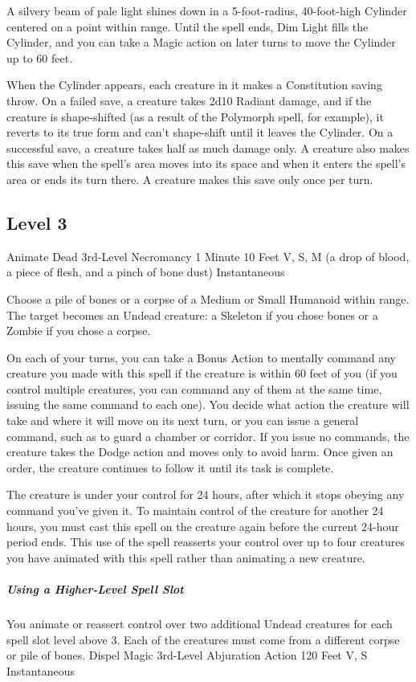 \documentclass[letterpaper,openany,oneside,twocolumn]{book}
\begin{document}
A silvery beam of pale light shines down in a 5-foot-radius, 40-foot-high Cylinder centered on a point within range. Until the spell ends, Dim Light fills the Cylinder, and you can take a Magic action on later turns to move the Cylinder up to 60 feet.

When the Cylinder appears, each creature in it makes a Constitution saving throw. On a failed save, a creature takes 2d10 Radiant damage, and if the creature is shape-shifted (as a result of the Polymorph spell, for example), it reverts to its true form and can't shape-shift until it leaves the Cylinder. On a successful save, a creature takes half as much damage only. A creature also makes this save when the spell's area moves into its space and when it enters the spell's area or ends its turn there. A creature makes this save only once per turn.

\subsection*{Level 3}
\DndSpellHeader
  {Animate Dead}
  {3rd-Level Necromancy}
  {1 Minute}
  {10 Feet}
  {V, S, M (a drop of blood, a piece of flesh, and a pinch of bone dust)}
  {Instantaneous}

Choose a pile of bones or a corpse of a Medium or Small Humanoid within range. The target becomes an Undead creature: a Skeleton if you chose bones or a Zombie if you chose a corpse.

On each of your turns, you can take a Bonus Action to mentally command any creature you made with this spell if the creature is within 60 feet of you (if you control multiple creatures, you can command any of them at the same time, issuing the same command to each one). You decide what action the creature will take and where it will move on its next turn, or you can issue a general command, such as to guard a chamber or corridor. If you issue no commands, the creature takes the Dodge action and moves only to avoid harm. Once given an order, the creature continues to follow it until its task is complete.

The creature is under your control for 24 hours, after which it stops obeying any command you've given it. To maintain control of the creature for another 24 hours, you must cast this spell on the creature again before the current 24-hour period ends. This use of the spell reasserts your control over up to four creatures you have animated with this spell rather than animating a new creature.

\subparagraph*{Using a Higher-Level Spell Slot} You animate or reassert control over two additional Undead creatures for each spell slot level above 3. Each of the creatures must come from a different corpse or pile of bones.
\DndSpellHeader
  {Dispel Magic}
  {3rd-Level Abjuration}
  {Action}
  {120 Feet}
  {V, S}
  {Instantaneous}
\end{document}
